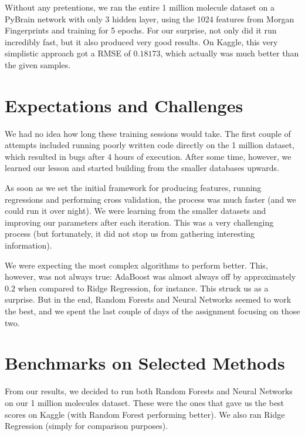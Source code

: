 \documentclass[10pt]{article}
\begin{document}
\medskip

Without any pretentions, we ran the entire 1 million molecule dataset on a 
PyBrain network with only $3$ hidden layer, using the 1024 features from
Morgan Fingerprints and training for 5 epochs. For our surprise, not only did it run incredibly fast,
but it also produced very good results. On Kaggle, this very simplistic approach
got a RMSE of $0.18173$, which actually was much better than the given samples.

\section{Expectations and Challenges}

We had no idea how long these training sessions would take. The first couple of
attempts included running poorly written code directly on the 1 million dataset,
which resulted in bugs after 4 hours of execution. After some time, however,
we learned our lesson and started building from the smaller databases upwards.

\medskip

As soon as we set the initial framework for producing features, running regressions
and performing cross validation, the process was much faster (and we could run it
over night). We were learning from the smaller datasets and improving our parameters
after each iteration. This was a very challenging process (but fortunately, it did not stop
us from gathering interesting information).

\medskip

We were expecting the most complex algorithms to perform better. This, however,
was not always true: AdaBoost was almost always off by approximately $0.2$ when compared to
Ridge Regression, for instance. This struck us as a surprise. But in the end,
Random Forests and Neural Networks seemed to work the best, and we spent 
the last couple of days of the assignment focusing on those two.

\section{Benchmarks on Selected Methods}

From our results, we decided to run both Random Forests and Neural Networks on
our 1 million molecules dataset. These were the ones that gave us the best
scores on Kaggle (with Random Forest performing better). We also ran
Ridge Regression (simply for comparison purposes).
\end{document}
